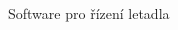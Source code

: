 \documentclass[final]{beamer}
\newlength{\sepwidth}
\newlength{\colwidth}
\newcommand{\separatorcolumn}{\begin{column}{\sepwidth}\end{column}}
\begin{document}
\begin{frame}[t]
\begin{columns}[t]
\begin{column}{\colwidth}
\begin{block}{Software pro řízení letadla}
\begin{columns}[T]
\begin{column}{.6\textwidth}
				\end{column}
			\end{columns}



      \end{block}

    \end{column}

    \separatorcolumn
  \end{columns}
\end{frame}
\end{document}

